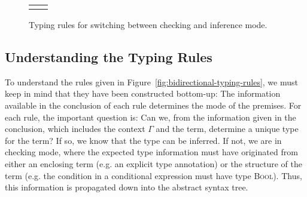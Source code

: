 \newsavebox{\ptCheckInfer}
\begin{lrbox}{\ptCheckInfer}
\begin{varwidth}{\linewidth}
\begin{prooftree}
\end{prooftree}
\end{varwidth}
\end{lrbox}

\newsavebox{\ptAnno}
\begin{lrbox}{\ptAnno}
\begin{varwidth}{\linewidth}
\begin{prooftree}
\end{prooftree}
\end{varwidth}
\end{lrbox}

\begin{figure}
\begin{center}
\begin{tabu}{c c}
\usebox{\ptCheckInfer} & \usebox{\ptAnno}
\end{tabu}
\end{center}
\caption{Typing rules for switching between checking and inference mode.}
\label{fig:bidirectional-modes}
\end{figure}


\subsection{Understanding the Typing Rules}
To understand the rules given in Figure~\ref{fig:bidirectional-typing-rules}, we must keep in mind that they have been constructed bottom-up: The information available in the conclusion of each rule determines the mode of the premises. For each rule, the important question is: Can we, from the information given in the conclusion, which includes the context $\Gamma$ and the term, determine a unique type for the term? If so, we know that the type can be inferred. If not, we are in checking mode, where the expected type information must have originated from either an enclosing term (e.g. an explicit type annotation) or the structure of the term (e.g. the condition in a conditional expression must have type \textsc{Bool}). Thus, this information is propagated down into the abstract syntax tree.

